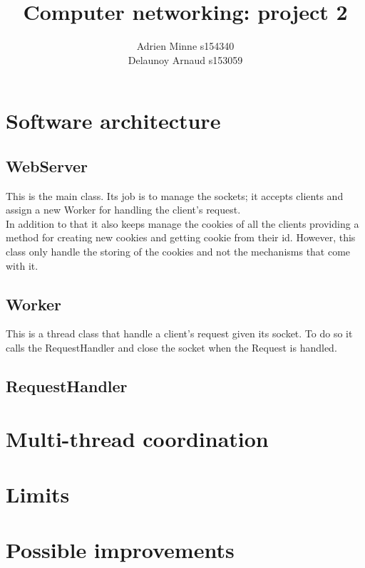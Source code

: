 \documentclass[11pt]{article}
\title{Computer networking: project 2}
\author{ Adrien Minne s154340 \\ Delaunoy Arnaud s153059}
\date{}
\begin{document}
\begin{titlepage}
\maketitle
\setcounter{page}{0}
\thispagestyle{empty}
\end{titlepage}

\section{Software architecture}

\subsection{WebServer}
This is the main class. Its job is to manage the sockets; it accepts clients and assign a new Worker for handling the client's request.\\
In addition to that it also keeps manage the cookies of all the clients providing a method for creating new cookies and getting cookie from their id. However, this class only handle the storing of the cookies and not the mechanisms that come with it.

\subsection{Worker}
This is a thread class that handle a client's request given its socket. To do so it calls the RequestHandler and close the socket when the Request is handled.

\subsection{RequestHandler}



\section{Multi-thread coordination}

\section{Limits}

\section{Possible improvements}
\end{document}
